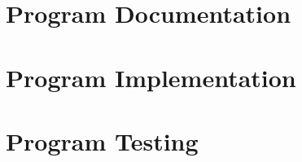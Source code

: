 \chapter{Program Documentation}
	
	

\chapter{Program Implementation}
	
	

\chapter{Program Testing}
	

